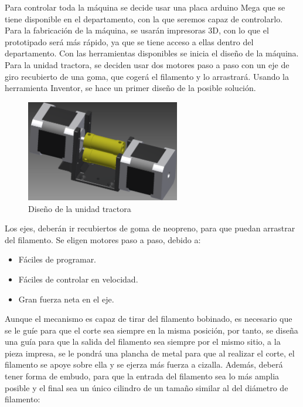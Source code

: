 Para controlar toda la máquina se decide usar una placa arduino Mega que se tiene disponible en el departamento, con la que seremos capaz de controlarlo. Para la fabricación de la máquina, se usarán impresoras 3D, con lo que el prototipado será más rápido, ya que se tiene acceso a ellas dentro del departamento. Con las herramientas disponibles se inicia el diseño de la máquina.\\

Para la unidad tractora, se deciden usar dos motores paso a paso con un eje de giro recubierto de una goma, que cogerá el filamento y lo arrastrará. Usando la herramienta Inventor, se hace un primer diseño de la posible solución.

\begin{figure}[H]
    \centering
    \includegraphics[width=0.6\textwidth]{images/peletizadora/unidadtractora.png}
    \caption{Diseño de la unidad tractora}
    \label{fig:peletizadora_tractora}
\end{figure}

Los ejes, deberán ir recubiertos de goma de neopreno, para que puedan arrastrar del filamento. Se eligen motores paso a paso, debido a:

\begin{itemize}
	\item{Fáciles de programar.}
	\item{Fáciles de controlar en velocidad.}
	\item{Gran fuerza neta en el eje.}
\end{itemize}

Aunque el mecanismo es capaz de tirar del filamento bobinado, es necesario que se le guíe para que el corte sea siempre en la misma posición, por tanto, se diseña una guía para que la salida del filamento sea siempre por el mismo sitio, a la pieza impresa, se le pondrá una plancha de metal para que al realizar el corte, el filamento se apoye sobre ella y se ejerza más fuerza a cizalla. Además, deberá tener forma de embudo, para que la entrada del filamento sea lo más amplia posible y el final sea un único cilindro de un tamaño similar al del diámetro de filamento:

